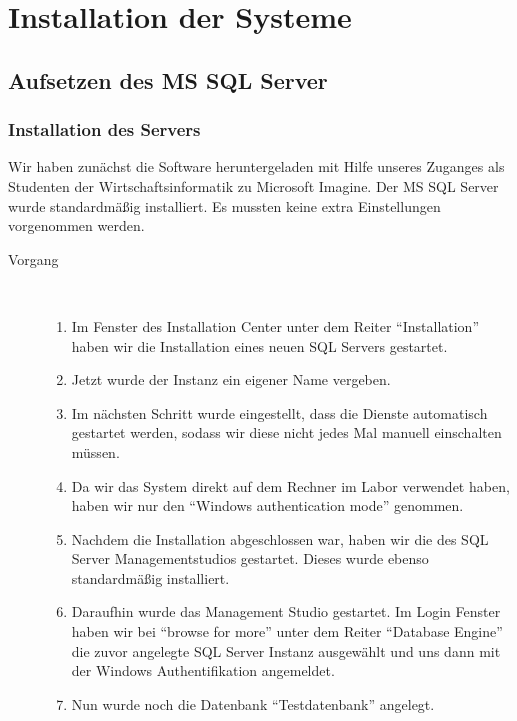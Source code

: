 \documentclass[a4paper, 12pt]{scrartcl}
\begin{document}
\newpage
\section{Installation der Systeme}
\subsection{Aufsetzen des MS SQL Server}
\subsubsection{Installation des Servers}
Wir haben zunächst die Software heruntergeladen mit Hilfe unseres Zuganges als Studenten der Wirtschaftsinformatik zu Microsoft Imagine. 
Der MS SQL Server wurde standardmäßig installiert. Es mussten keine extra Einstellungen vorgenommen werden. 
\begin{description}
	\item[Vorgang]~\par 
	\begin{enumerate}
		\item Im Fenster des Installation Center unter dem Reiter "`Installation"' haben wir die Installation eines neuen SQL Servers gestartet. 
		\item Jetzt wurde der Instanz ein eigener Name vergeben. 
		\item Im nächsten Schritt wurde eingestellt, dass die Dienste automatisch gestartet werden, sodass wir diese nicht jedes Mal manuell einschalten müssen. 
		\item Da wir das System direkt auf dem Rechner im Labor verwendet haben, haben wir nur den "`Windows authentication mode"' genommen.
		\item Nachdem die Installation abgeschlossen war, haben wir die des SQL Server Managementstudios gestartet. Dieses wurde ebenso standardmäßig installiert. 
		\item Daraufhin wurde das Management Studio gestartet. Im Login Fenster haben wir bei "`browse for more"' unter dem Reiter "`Database Engine"' die zuvor angelegte SQL Server Instanz ausgewählt und uns dann mit der Windows Authentifikation angemeldet. 
		\item Nun wurde noch die Datenbank "`Testdatenbank"' angelegt. 
	\end{enumerate}
\end{description}
\end{document}
